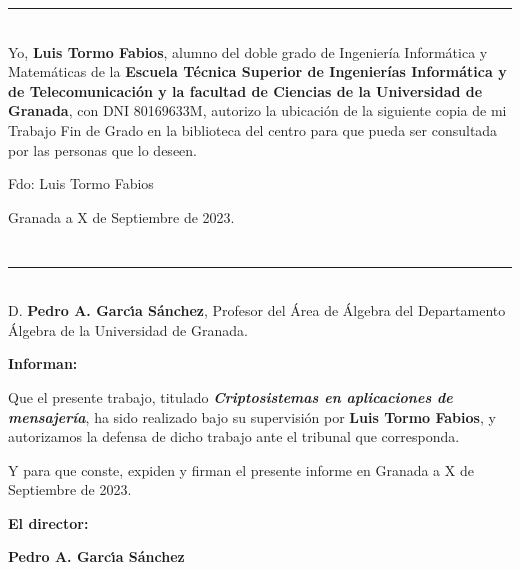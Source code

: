 \noindent\rule[-1ex]{\textwidth}{2pt}\\[4.5ex]

Yo, \textbf{Luis Tormo Fabios}, alumno del doble grado de Ingeniería Informática y Matemáticas de la \textbf{Escuela Técnica Superior
de Ingenierías Informática y de Telecomunicación y la facultad de Ciencias de la Universidad de Granada}, con DNI 80169633M, autorizo la
ubicación de la siguiente copia de mi Trabajo Fin de Grado en la biblioteca del centro para que pueda ser
consultada por las personas que lo deseen.

\vspace{6cm}

\noindent Fdo: Luis Tormo Fabios

\vspace{2cm}

\begin{flushright}
Granada a X de Septiembre de 2023.
\end{flushright}


\chapter*{}
\thispagestyle{empty}

\noindent\rule[-1ex]{\textwidth}{2pt}\\[4.5ex]

D. \textbf{Pedro A. Garcı́a Sánchez}, Profesor del Área de Álgebra del Departamento Álgebra de la Universidad de Granada.

\vspace{0.5cm}

\textbf{Informan:}

\vspace{0.5cm}

Que el presente trabajo, titulado \textit{\textbf{Criptosistemas en aplicaciones de mensajería}},
ha sido realizado bajo su supervisión por \textbf{Luis Tormo Fabios}, y autorizamos la defensa de dicho trabajo ante el tribunal
que corresponda.

\vspace{0.5cm}

Y para que conste, expiden y firman el presente informe en Granada a X de Septiembre de 2023.

\vspace{1cm}

\textbf{El director:}

\vspace{5cm}

\noindent \textbf{Pedro A. Garcı́a Sánchez}

